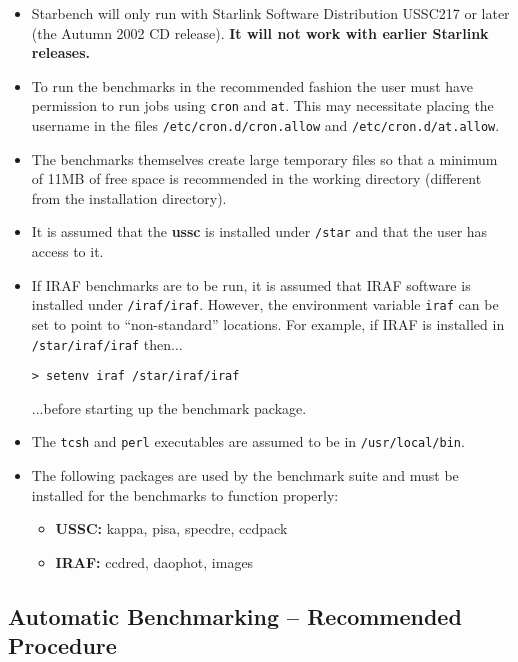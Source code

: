 \begin{itemize}
\item Starbench \pkgver will only run with Starlink Software Distribution
USSC217 or later (the Autumn 2002 CD release). {\bf It will not work
with earlier Starlink releases.}

\item To run the benchmarks in the recommended fashion the user must
have permission to run jobs using {\tt cron} and {\tt at}. This may
necessitate placing the username in the files {\tt /etc/cron.d/cron.allow}
and {\tt /etc/cron.d/at.allow}.

\item The benchmarks themselves create large temporary files so that a
minimum of 11MB of free space is recommended in the working directory
(different from the installation directory).

\item It is assumed that the {\bf ussc} is installed under {\tt /star} and
that the user has access to it.

\item If IRAF benchmarks are to be run, it is
assumed that IRAF software is installed under {\tt /iraf/iraf}. However,
the environment variable {\tt iraf} can be set to point to ``non-standard''
locations. For example, if IRAF is installed in {\tt /star/iraf/iraf} then...

{\tt > setenv iraf /star/iraf/iraf}

...before starting up the benchmark package.


\item The {\tt tcsh} and {\tt perl} executables are assumed to be in
{\tt /usr/local/bin}.

\item The following packages are used by the benchmark suite and must be
installed for the benchmarks to function properly:

  \begin{itemize}
    \item {\bf USSC: } kappa, pisa, specdre, ccdpack
    \item {\bf IRAF: } ccdred, daophot, images
  \end{itemize}
\end{itemize}

\subsection{Automatic Benchmarking -- Recommended Procedure}

